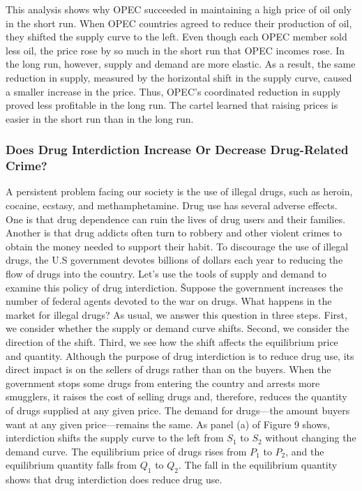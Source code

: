 This analysis shows why OPEC succeeded in maintaining a high price of oil only in the short run. When OPEC countries
agreed to reduce their production of oil, they shifted the supply curve to the left. Even though each OPEC member
sold less oil, the price rose by so much in the short run that OPEC incomes rose. In the long run, however, supply
and demand are more elastic. As a result, the same reduction in supply, measured by the horizontal shift in the
supply curve, caused a smaller increase in the price. Thus, OPEC's coordinated reduction in supply proved less
profitable in the long run. The cartel learned that raising prices is easier in the short run than in the long run.

\subsubsection*{Does Drug Interdiction Increase Or Decrease Drug-Related Crime?}

A persistent problem facing our society is the use of illegal drugs, such as heroin, cocaine, ecstasy, and
methamphetamine. Drug use has several adverse effects. One is that drug dependence can ruin the lives of drug users
and their families. Another is that drug addicts often turn to robbery and other violent crimes to obtain the money
needed to support their habit. To discourage the use of illegal drugs, the U.S government devotes billions of dollars
each year to reducing the flow of drugs into the country. Let's use the tools of supply and demand to examine this
policy of drug interdiction. \v

Suppose the government increases the number of federal agents devoted to the war on drugs. What happens in the market
for illegal drugs? As usual, we answer this question in three steps. First, we consider whether the supply or demand
curve shifts. Second, we consider the direction of the shift. Third, we see how the shift affects the equilibrium
price and quantity. Although the purpose of drug interdiction is to reduce drug use, its direct impact is on the
sellers of drugs rather than on the buyers. When the government stops some drugs from entering the country and
arrests more smugglers, it raises the cost of selling drugs and, therefore, reduces the quantity of drugs supplied at
any given price. The demand for drugs—the amount buyers want at any given price—remains the same. As panel (a) of
Figure 9 shows, interdiction shifts the supply curve to the left from $S_1$ to $S_2$ without changing the demand
curve. The equilibrium price of drugs rises from $P_1$ to $P_2$, and the equilibrium quantity falls from $Q_1$ to
$Q_2$. The fall in the equilibrium quantity shows that drug interdiction does reduce drug use.


